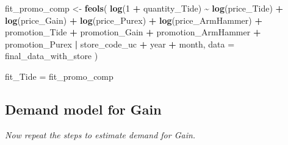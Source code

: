 \documentclass[
]{article}
\newenvironment{Shaded}{\begin{snugshade}}{\end{snugshade}}
\newcommand{\AttributeTok}[1]{\textcolor[rgb]{0.13,0.29,0.53}{#1}}
\newcommand{\DecValTok}[1]{\textcolor[rgb]{0.00,0.00,0.81}{#1}}
\newcommand{\FunctionTok}[1]{\textcolor[rgb]{0.13,0.29,0.53}{\textbf{#1}}}
\newcommand{\NormalTok}[1]{#1}
\newcommand{\OtherTok}[1]{\textcolor[rgb]{0.56,0.35,0.01}{#1}}
\newcommand{\SpecialCharTok}[1]{\textcolor[rgb]{0.81,0.36,0.00}{\textbf{#1}}}
\begin{document}
\begin{Shaded}
\begin{Highlighting}[]
\NormalTok{fit\_promo\_comp }\OtherTok{\textless{}{-}} \FunctionTok{feols}\NormalTok{(}
  \FunctionTok{log}\NormalTok{(}\DecValTok{1} \SpecialCharTok{+}\NormalTok{ quantity\_Tide) }\SpecialCharTok{\textasciitilde{}} \FunctionTok{log}\NormalTok{(price\_Tide) }\SpecialCharTok{+} \FunctionTok{log}\NormalTok{(price\_Gain) }\SpecialCharTok{+} \FunctionTok{log}\NormalTok{(price\_Purex)}
  \SpecialCharTok{+} \FunctionTok{log}\NormalTok{(price\_ArmHammer) }\SpecialCharTok{+}\NormalTok{ promotion\_Tide }\SpecialCharTok{+}\NormalTok{ promotion\_Gain }\SpecialCharTok{+}\NormalTok{ promotion\_ArmHammer}
  \SpecialCharTok{+}\NormalTok{ promotion\_Purex }\SpecialCharTok{|}\NormalTok{ store\_code\_uc }\SpecialCharTok{+}\NormalTok{ year }\SpecialCharTok{+}\NormalTok{ month, }\AttributeTok{data =}\NormalTok{ final\_data\_with\_store}
\NormalTok{)}
\end{Highlighting}
\end{Shaded}

\begin{Shaded}
\begin{Highlighting}[]
\NormalTok{fit\_Tide }\OtherTok{=}\NormalTok{ fit\_promo\_comp}
\end{Highlighting}
\end{Shaded}

\subsection{Demand model for Gain}\label{demand-model-for-gain}

\emph{Now repeat the steps to estimate demand for Gain.}
\end{document}
